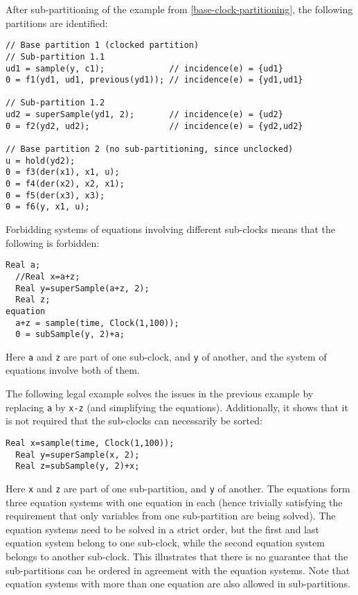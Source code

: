 \begin{example}
After sub-partitioning of the example from \cref{base-clock-partitioning}, the following partitions are identified:
\begin{lstlisting}[language=modelica]
// Base partition 1 (clocked partition)
// Sub-partition 1.1
ud1 = sample(y, c1);             // incidence(e) = {ud1}
0 = f1(yd1, ud1, previous(yd1)); // incidence(e) = {yd1,ud1}

// Sub-partition 1.2
ud2 = superSample(yd1, 2);       // incidence(e) = {ud2}
0 = f2(yd2, ud2);                // incidence(e) = {yd2,ud2}

// Base partition 2 (no sub-partitioning, since unclocked)
u = hold(yd2);
0 = f3(der(x1), x1, u);
0 = f4(der(x2), x2, x1);
0 = f5(der(x3), x3);
0 = f6(y, x1, u);
\end{lstlisting}
\end{example}

\begin{example}
Forbidding systems of equations involving different sub-clocks means that the following is forbidden:
\begin{lstlisting}[language=modelica]
  Real a;
  //Real x=a+z;
  Real y=superSample(a+z, 2);
  Real z;
equation
  a+z = sample(time, Clock(1,100));
  0 = subSample(y, 2)+a;
\end{lstlisting}
Here \lstinline!a! and \lstinline!z! are part of one sub-clock, and \lstinline!y! of another, and the system of equations involve both of them.

The following legal example solves the issues in the previous example by replacing \lstinline!a! by \lstinline!x-z! (and simplifying the equations).
Additionally, it shows that it is not required that the sub-clocks can necessarily be sorted:
\begin{lstlisting}[language=modelica]
  Real x=sample(time, Clock(1,100));
  Real y=superSample(x, 2);
  Real z=subSample(y, 2)+x;
\end{lstlisting}
Here \lstinline!x! and \lstinline!z! are part of one sub-partition, and \lstinline!y! of another.
The equations form three equation systems with one equation in each (hence trivially satisfying the requirement that only variables from one sub-partition are being solved).
The equation systems need to be solved in a strict order, but the first and last equation system belong to one sub-clock, while the second equation system belongs to another sub-clock.
This illustrates that there is no guarantee that the sub-partitions can be ordered in agreement with the equation systems.
Note that equation systems with more than one equation are also allowed in sub-partitions.
\end{example}

